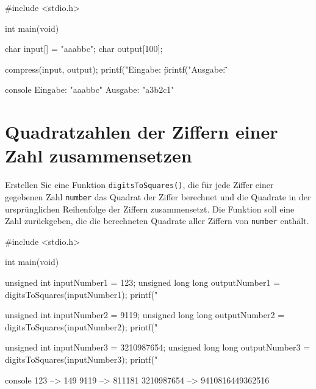 \Vorlage
\begin{codebox}[lang=c, fontsize=\small]
#include <stdio.h>

int main(void) {
    char input[] = "aaabbc";
    char output[100];

    compress(input, output);
    printf("Eingabe: \"%
    printf("Ausgabe: \"%
}
\end{codebox}

\begin{mybox}[Bildschirmausgabe]{console}
Eingabe: "aaabbc"
Ausgabe: "a3b2c1"
\end{mybox}




\chapter{Quadratzahlen der Ziffern einer Zahl zusammensetzen}

\vspace{10pt}

Erstellen Sie eine Funktion \texttt{digitsToSquares()}, die für jede
Ziffer einer gegebenen Zahl \texttt{number} das Quadrat der Ziffer
berechnet und die Quadrate in der ursprünglichen Reihenfolge der Ziffern
zusammensetzt. Die Funktion soll eine Zahl zurückgeben, die die berechneten
Quadrate aller Ziffern von \texttt{number} enthält.

\Vorlage
\begin{codebox}[lang=c, fontsize=\small]
#include <stdio.h>

int main(void) {
    unsigned int inputNumber1 = 123;
    unsigned long long outputNumber1 = digitsToSquares(inputNumber1);
    printf("%

    unsigned int inputNumber2 = 9119;
    unsigned long long outputNumber2 = digitsToSquares(inputNumber2);
    printf("%

    unsigned int inputNumber3 = 3210987654;
    unsigned long long outputNumber3 = digitsToSquares(inputNumber3);
    printf("%
}
\end{codebox}

\begin{mybox}[title=Bildschirmausgabe]{console}
123 --> 149
9119 --> 811181
3210987654 --> 9410816449362516
\end{mybox}




